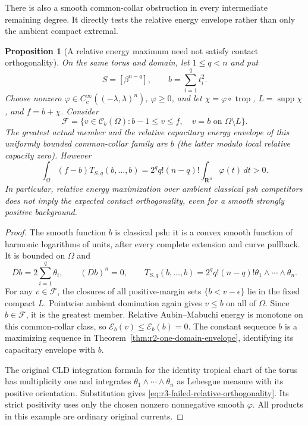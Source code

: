 \documentclass[11pt,a4paper]{article}
\numberwithin{equation}{section}
\newtheorem{proposition}[theorem]{Proposition}
\theoremstyle{definition}
\theoremstyle{remark}
\newcommand{\Cb}{\mathcal C_b}
\begin{document}
There is also a smooth common-collar obstruction in every
intermediate remaining degree. It directly tests the relative
energy envelope rather than only the ambient compact extremal.

\begin{proposition}[A relative energy maximum need not satisfy contact orthogonality]
\label{prop:r3-relative-energy-contact-false}
On the same torus and domain, let $1\leq q<n$ and put
\[
 S=[\beta^{n-q}],\qquad b=\sum_{i=1}^q t_i^2.
\]
Choose nonzero $\varphi\in C_c^\infty((-\lambda,\lambda)^n)$,
$\varphi\geq0$, and let $\chi=\varphi\circ\operatorname{trop}$,
$L=\operatorname{supp}\chi$, and $f=b+\chi$. Consider
\[
 \mathcal F=\{v\in\Cb(\Omega):
       b-1\leq v\leq f,\quad v=b\text{ on }\Omega\setminus L\}.
\]
The greatest actual member and the relative capacitary energy
envelope of this uniformly bounded common-collar family are $b$
(the latter modulo local relative capacity zero). However
\begin{equation}
\label{eq:r3-failed-relative-orthogonality}
 \int_\Omega(f-b)T_{S,q}(b,\ldots,b)
    =2^q q!(n-q)!\int_{\mathbf R^n}\varphi(t)\,dt>0.
\end{equation}
In particular, relative energy maximization over ambient
classical psh competitors does not imply the expected contact
orthogonality, even for a smooth strongly positive background.
\end{proposition}

\begin{proof}
The smooth function $b$ is classical psh: it is a convex smooth
function of harmonic logarithms of units, after every complete
extension and curve pullback. It is bounded on $\Omega$ and
\[
 Db=2\sum_{i=1}^q\theta_i,
 \qquad (Db)^n=0,
 \qquad T_{S,q}(b,\ldots,b)
       =2^q q!(n-q)!\theta_1\wedge\cdots\wedge\theta_n.
\]
For any $v\in\mathcal F$, the closures of all positive-margin
sets $\{b<v-\epsilon\}$ lie in the fixed compact $L$.
Pointwise ambient domination again gives $v\leq b$ on all of
$\Omega$. Since $b\in\mathcal F$, it is the greatest member.
Relative Aubin--Mabuchi energy is monotone on this common-collar
class, so $\mathcal E_b(v)\leq\mathcal E_b(b)=0$. The constant
sequence $b$ is a maximizing sequence in
Theorem~\ref{thm:r2-one-domain-envelope}, identifying its
capacitary envelope with $b$.

The original CLD integration formula for the identity tropical
chart of the torus has multiplicity one and integrates
$\theta_1\wedge\cdots\wedge\theta_n$ as Lebesgue measure
with its positive orientation. Substitution gives
\eqref{eq:r3-failed-relative-orthogonality}. Its strict positivity
uses only the chosen nonzero nonnegative smooth $\varphi$.
All products in this example are ordinary original currents.
\end{proof}
\end{document}
